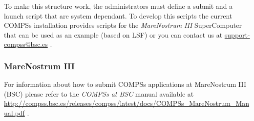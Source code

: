 To make this structure work, the administrators must define a submit and a launch script that are system dependant. To develop this
scripts the current COMPSs installation provides scripts for the \textit{MareNostrum III} SuperComputer that can be used as an 
example (based on LSF) or you can contact us at \url{support-compss@bsc.es} .

\subsubsection{MareNostrum III}

For information about how to submit COMPSs applications at MareNostrum III (BSC) please refer to the \textit{COMPSs at BSC} manual 
available at \url{http://compss.bsc.es/releases/compss/latest/docs/COMPSs_MareNostrum_Manual.pdf} .
